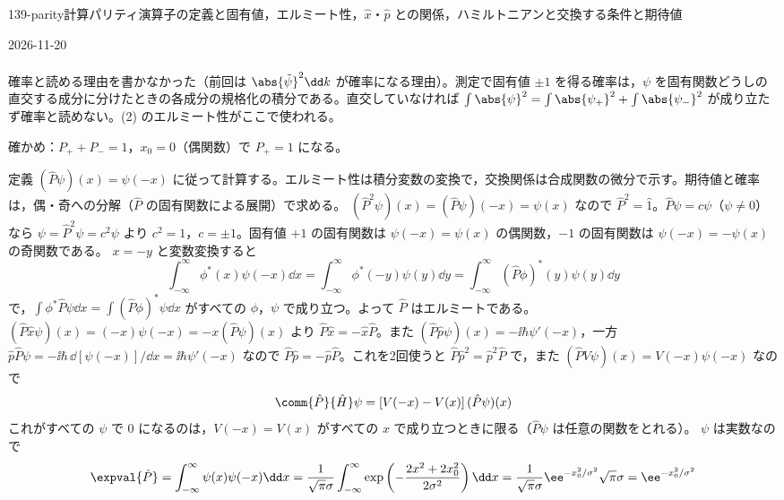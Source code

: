 \documentclass[uplatex,dvipdfmx,a4paper,11pt]{jsarticle}
\begin{document}
\begin{mondai}{139-parity}{計算}{パリティ演算子の定義と固有値，エルミート性，$\hat{x}$・$\hat{p}$ との関係，ハミルトニアンと交換する条件と期待値}
\begin{kotaeutsushi}{2026-11-20}
\begin{align*}
\end{align*}
\end{kotaeutsushi}
\begin{kizuki}
\item {} 確率と読める理由を書かなかった（前回は $\abs{\tilde{\psi}}^{2}\dd k$ が確率になる理由）。測定で固有値 $\pm1$ を得る確率は，$\psi$ を固有関数どうしの直交する成分に分けたときの各成分の規格化の積分である。直交していなければ $\int\abs{\psi}^{2}=\int\abs{\psi_{+}}^{2}+\int\abs{\psi_{-}}^{2}$ が成り立たず確率と読めない。(2) のエルミート性がここで使われる。
\item 確かめ：$P_{+}+P_{-}=1$，$x_{0}=0$（偶関数）で $P_{+}=1$ になる。
\end{kizuki}
\begin{tadashii}
\houshin 定義 $(\hat{P}\psi)(x)=\psi(-x)$ に従って計算する。エルミート性は積分変数の変換で，交換関係は合成関数の微分で示す。期待値と確率は，偶・奇への分解（$\hat{P}$ の固有関数による展開）で求める。
\keisan
{} $(\hat{P}^{2}\psi)(x)=(\hat{P}\psi)(-x)=\psi(x)$ なので $\hat{P}^{2}=\hat{1}$。$\hat{P}\psi=c\psi$（$\psi\neq0$）なら $\psi=\hat{P}^{2}\psi=c^{2}\psi$ より $c^{2}=1$，$c=\pm1$。固有値 $+1$ の固有関数は $\psi(-x)=\psi(x)$ の偶関数，$-1$ の固有関数は $\psi(-x)=-\psi(x)$ の奇関数である。
 $x=-y$ と変数変換すると
\[ \int_{-\infty}^{\infty}\phi^{*}(x)\psi(-x)\dd x=\int_{-\infty}^{\infty}\phi^{*}(-y)\psi(y)\dd y=\int_{-\infty}^{\infty}(\hat{P}\phi)^{*}(y)\psi(y)\dd y \]
で，$\int\phi^{*}\hat{P}\psi\dd x=\int(\hat{P}\phi)^{*}\psi\dd x$ がすべての $\phi$，$\psi$ で成り立つ。よって $\hat{P}$ はエルミートである。
 $(\hat{P}\hat{x}\psi)(x)=(-x)\psi(-x)=-x(\hat{P}\psi)(x)$ より $\hat{P}\hat{x}=-\hat{x}\hat{P}$。また $(\hat{P}\hat{p}\psi)(x)=-\ii\hbar\psi'(-x)$，一方 $\hat{p}\hat{P}\psi=-\ii\hbar\,\dd[\psi(-x)]/\dd x=\ii\hbar\psi'(-x)$ なので $\hat{P}\hat{p}=-\hat{p}\hat{P}$。これを2回使うと $\hat{P}\hat{p}^{2}=\hat{p}^{2}\hat{P}$ で，また $(\hat{P}V\psi)(x)=V(-x)\psi(-x)$ なので
\[ \comm{\hat{P}}{\hat{H}}\psi=\left[V(-x)-V(x)\right](\hat{P}\psi)(x) \]
これがすべての $\psi$ で $0$ になるのは，$V(-x)=V(x)$ がすべての $x$ で成り立つときに限る（$\hat{P}\psi$ は任意の関数をとれる）。
 $\psi$ は実数なので
\[ \expval{\hat{P}}=\int_{-\infty}^{\infty}\psi(x)\psi(-x)\dd x=\frac{1}{\sqrt{\pi}\sigma}\int_{-\infty}^{\infty}\exp\left(-\frac{2x^{2}+2x_{0}^{2}}{2\sigma^{2}}\right)\dd x=\frac{1}{\sqrt{\pi}\sigma}\ee^{-x_{0}^{2}/\sigma^{2}}\sqrt{\pi}\sigma=\ee^{-x_{0}^{2}/\sigma^{2}} \]

\end{tadashii}
\end{mondai}
\end{document}
